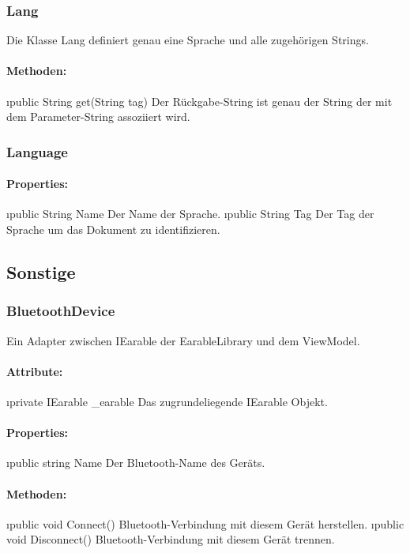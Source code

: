 \documentclass[../entwurf.tex]{subfiles}
\begin{document}
			\subsubsection{Lang}
				Die Klasse Lang definiert genau eine Sprache und alle zugehörigen Strings. 
				\paragraph{Methoden:}
					\begin{itemize}
						\i{public String get(String tag)} Der Rückgabe-String ist genau der String der mit dem Parameter-String assoziiert wird.
					\end{itemize}
			\subsubsection{Language}
				\paragraph{Properties:}
					\begin{itemize}
						\i{public String Name} Der Name der Sprache.
						\i{public String Tag} Der Tag der Sprache um das Dokument zu identifizieren.
					\end{itemize}
		\subsection{Sonstige}
			\subsubsection{BluetoothDevice}
				Ein Adapter zwischen IEarable der EarableLibrary und dem ViewModel.
				\paragraph{Attribute:}
					\begin{itemize}
						\i{private IEarable \_earable} Das zugrundeliegende IEarable Objekt.
					\end{itemize}
				\paragraph{Properties:}
					\begin{itemize}
						\i{public string Name} Der Bluetooth-Name des Geräts.
					\end{itemize}
				\paragraph{Methoden:}
					\begin{itemize}
						\i{public void Connect()} Bluetooth-Verbindung mit diesem Gerät herstellen.
						\i{public void Disconnect()} Bluetooth-Verbindung mit diesem Gerät trennen.
					\end{itemize}
					
\end{document}
